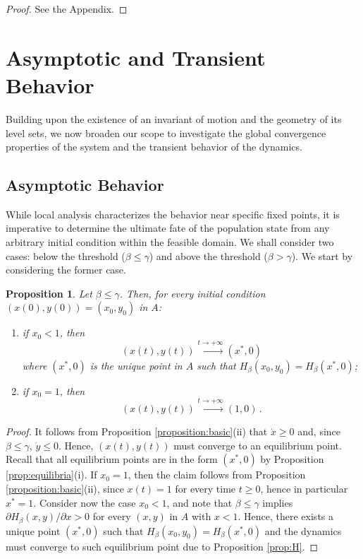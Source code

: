 \documentclass{article}
\newtheorem{proposition}[theorem]{Proposition}
\begin{document}
\begin{proof}
See the Appendix.
\end{proof}

\section{Asymptotic and Transient Behavior}\label{sec:beh}

Building upon the existence of an invariant of motion and the geometry of its level sets, we now broaden our scope to investigate the global convergence properties of the system and the transient behavior of the dynamics.

\subsection{Asymptotic Behavior}\label{sec:asymptotic}
While local analysis characterizes the behavior near specific fixed points, it is imperative to determine the ultimate fate of the population state from any arbitrary initial condition within the feasible domain. We shall consider two cases: below the threshold ($\beta \le \gamma$) and above the threshold ($\beta > \gamma$). We start by considering the former case.

\begin{proposition}
Let $\beta \le \gamma$. Then, for every initial condition $(x(0),y(0)) = (x_0,y_0)$ in $A$: 
\begin{enumerate}
    \item[(i)] if $x_0 < 1$, then
\begin{equation}\label{eq:as_below}
(x(t),y(t)) \xrightarrow{t \to + \infty} (x^*,0)
\end{equation}
where $(x^*,0)$ is the unique point in $A$ such that $H_\beta(x_0,y_0) = H_\beta(x^*,0)$;
\item[(ii)] if $x_0 = 1$, then
\begin{equation}\label{eq:as_below2}
(x(t),y(t)) \xrightarrow{t \to + \infty} (1,0)\,.\end{equation}
\end{enumerate} 
\end{proposition}
\begin{proof}
It follows from Proposition \ref{proposition:basic}(ii) that $\dot x \ge 0$ and, since $\beta \le \gamma$, $\dot y \le 0$. Hence, $(x(t),y(t))$ must converge to an equilibrium point. Recall that all equilibrium points are in the form $(x^*,0)$ by Proposition \ref{prop:equilibria}(i). If $x_0 = 1$, then the claim follows from Proposition \ref{proposition:basic}(ii), since $x(t) = 1$ for every time $t \ge 0$, hence in particular $x^* = 1$. Consider now the case $x_0 < 1$, and note that $\beta \le \gamma$ implies $\partial H_\beta(x,y) / \partial x > 0$ for every $(x,y)$ in $A$ with $x < 1$. Hence, there exists a unique point $(x^*,0)$ such that $H_\beta(x_0,y_0) = H_\beta(x^*,0)$ and the dynamics must converge to such equilibrium point due to Proposition \ref{prop:H}.  
\end{proof}
\end{document}
